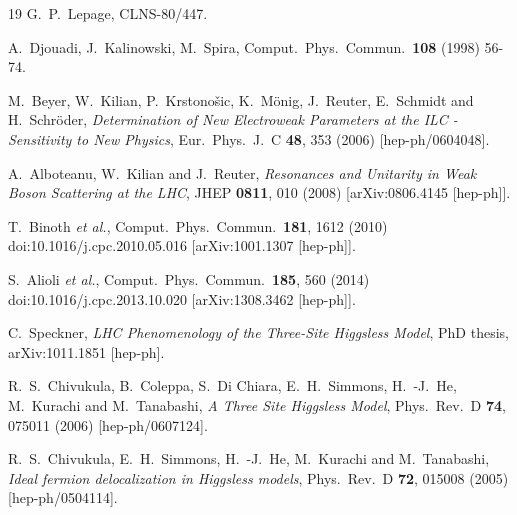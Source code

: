 \documentclass[12pt]{book}
\begin{document}
\begin{thebibliography}{19}
  G.~P.~Lepage,
  CLNS-80/447.

  A.~Djouadi, J.~Kalinowski, M.~Spira,
  Comput.\ Phys.\ Commun.\ \textbf{108} (1998) 56-74.

  M.~Beyer, W.~Kilian, P.~Krstono\v{s}ic, K.~M\"onig, J.~Reuter, E.~Schmidt
  and H.~Schr\"oder,
  {\em Determination of New Electroweak Parameters at the ILC -
    Sensitivity to New Physics},
  Eur.\ Phys.\ J.\ C {\bf 48}, 353 (2006)
  [hep-ph/0604048].

  A.~Alboteanu, W.~Kilian and J.~Reuter,
  {\em Resonances and Unitarity in Weak Boson Scattering at the LHC},
  JHEP {\bf 0811}, 010 (2008)
  [arXiv:0806.4145 [hep-ph]].

  T.~Binoth {\it et al.},
  Comput.\ Phys.\ Commun.\  {\bf 181}, 1612 (2010)
  doi:10.1016/j.cpc.2010.05.016
  [arXiv:1001.1307 [hep-ph]].

  S.~Alioli {\it et al.},
  Comput.\ Phys.\ Commun.\  {\bf 185}, 560 (2014)
  doi:10.1016/j.cpc.2013.10.020
  [arXiv:1308.3462 [hep-ph]].

  C.~Speckner,
  {\em LHC Phenomenology of the Three-Site Higgsless Model},
  PhD thesis, arXiv:1011.1851 [hep-ph].

  R.~S.~Chivukula, B.~Coleppa, S.~Di Chiara, E.~H.~Simmons, H.~-J.~He,
  M.~Kurachi and M.~Tanabashi,
  {\em A Three Site Higgsless Model},
  Phys.\ Rev.\ D {\bf 74}, 075011 (2006)
  [hep-ph/0607124].

  R.~S.~Chivukula, E.~H.~Simmons, H.~-J.~He, M.~Kurachi and M.~Tanabashi,
  {\em Ideal fermion delocalization in Higgsless models},
  Phys.\ Rev.\ D {\bf 72}, 015008 (2005)
  [hep-ph/0504114].


\end{thebibliography}
\end{document}
